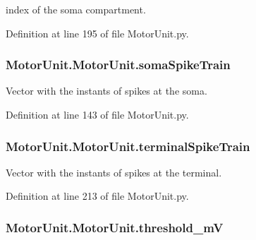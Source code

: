 index of the soma compartment. 



Definition at line 195 of file Motor\-Unit.\-py.

\hypertarget{class_motor_unit_1_1_motor_unit_a8c86d98daa6c509e226ab165fa92515f}{
\subsubsection[{soma\-Spike\-Train}]{\setlength{\rightskip}{0pt plus 5cm}Motor\-Unit.\-Motor\-Unit.\-soma\-Spike\-Train}}\label{class_motor_unit_1_1_motor_unit_a8c86d98daa6c509e226ab165fa92515f}


Vector with the instants of spikes at the soma. 



Definition at line 143 of file Motor\-Unit.\-py.

\hypertarget{class_motor_unit_1_1_motor_unit_a2e33990aaab69454943aa00db6b8d2eb}{
\subsubsection[{terminal\-Spike\-Train}]{\setlength{\rightskip}{0pt plus 5cm}Motor\-Unit.\-Motor\-Unit.\-terminal\-Spike\-Train}}\label{class_motor_unit_1_1_motor_unit_a2e33990aaab69454943aa00db6b8d2eb}


Vector with the instants of spikes at the terminal. 



Definition at line 213 of file Motor\-Unit.\-py.

\hypertarget{class_motor_unit_1_1_motor_unit_affbd0b90f1dce6a0f929775e54f8c212}{
\subsubsection[{threshold\-\_\-m\-V}]{\setlength{\rightskip}{0pt plus 5cm}Motor\-Unit.\-Motor\-Unit.\-threshold\-\_\-m\-V}}\label{class_motor_unit_1_1_motor_unit_affbd0b90f1dce6a0f929775e54f8c212}


